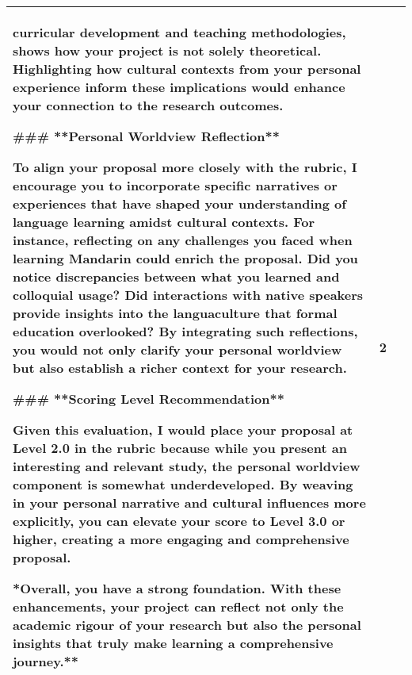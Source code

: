 \begin{center}
\begin{longtable}{|p{}|p{}|p{}|}
curricular development and teaching methodologies, shows how your project is not solely theoretical. Highlighting how cultural contexts from your personal experience inform these implications would enhance your connection to the research outcomes.\par \#\#\# **Personal Worldview Reflection**\par To align your proposal more closely with the rubric, I encourage you to incorporate specific narratives or experiences that have shaped your understanding of language learning amidst cultural contexts. For instance, reflecting on any challenges you faced when learning Mandarin could enrich the proposal. Did you notice discrepancies between what you learned and colloquial usage? Did interactions with native speakers provide insights into the languaculture that formal education overlooked? By integrating such reflections, you would not only clarify your personal worldview but also establish a richer context for your research.\par \#\#\# **Scoring Level Recommendation**\par Given this evaluation, I would place your proposal at Level 2.0 in the rubric because while you present an interesting and relevant study, the personal worldview component is somewhat underdeveloped. By weaving in your personal narrative and cultural influences more explicitly, you can elevate your score to Level 3.0 or higher, creating a more engaging and comprehensive proposal.\par **Overall, you have a strong foundation. With these enhancements, your project can reflect not only the academic rigour of your research but also the personal insights that truly make learning a comprehensive journey.** & 2 \\
\hline

\end{longtable}
\end{center}
